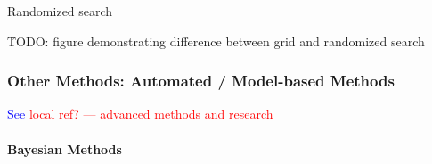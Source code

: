 \r{{Randomized search} }

\r{TODO: figure demonstrating difference between grid and randomized search}


\subsubsection{Other Methods: Automated / Model-based Methods}

\textcolor{blue}{See \textcolor{red}{local ref? --- advanced methods and research}}

\paragraph{Bayesian Methods}



